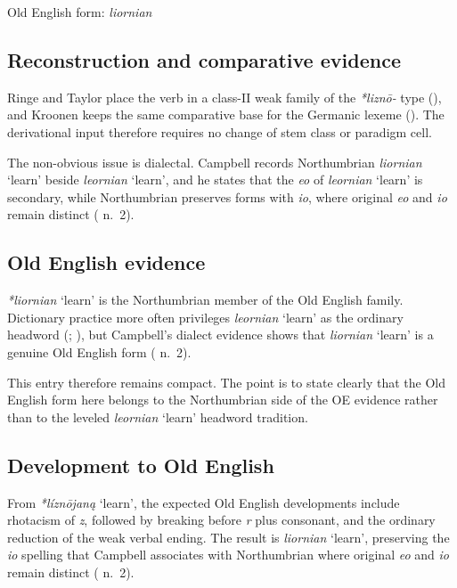 \documentclass[
  british,
  a4paper,
  openany]{book}
\providecommand{\Recon}[1]{\emph{*#1}}
{\catcode`→=\active \global\def→{\ensuremath{\rightarrow}}}
\providecommand{\Recon}[1]{\emph{*#1}}
{\catcode`→=\active \global\def→{\ensuremath{\rightarrow}}}
\begin{document}
Old English form: \emph{liornian}

\subsection{Reconstruction and comparative
evidence}\label{reconstruction-and-comparative-evidence-34}

Ringe and Taylor place the verb in a class-II weak family of the
\emph{*liznō-} type (), and Kroonen keeps the same comparative base for the Germanic
lexeme (). The derivational
input therefore requires no change of stem class or paradigm cell.

The non-obvious issue is dialectal. Campbell records Northumbrian
\emph{liornian} `learn' beside \emph{leornian} `learn', and he states
that the \emph{eo} of \emph{leornian} `learn' is secondary, while
Northumbrian preserves forms with \emph{io}, where original \emph{eo}
and \emph{io} remain distinct ( n.~2).

\subsection{Old English evidence}\label{old-english-evidence-34}

\Recon{liornian} `learn' is the Northumbrian member of the Old English
family. Dictionary practice more often privileges \emph{leornian}
`learn' as the ordinary headword (; ), but
Campbell's dialect evidence shows that \emph{liornian} `learn' is a
genuine Old English form ( n.~2).

This entry therefore remains compact. The point is to state clearly that
the Old English form here belongs to the Northumbrian side of the OE
evidence rather than to the leveled \emph{leornian} `learn' headword
tradition.

\subsection{Development to Old
English}\label{development-to-old-english-34}

From \Recon{líznōjaną} `learn', the expected Old English developments
include rhotacism of \emph{z}, followed by breaking before \emph{r} plus
consonant, and the ordinary reduction of the weak verbal ending. The
result is \emph{liornian} `learn', preserving the \emph{io} spelling
that Campbell associates with Northumbrian where original \emph{eo} and
\emph{io} remain distinct ( n.~2).
\end{document}
